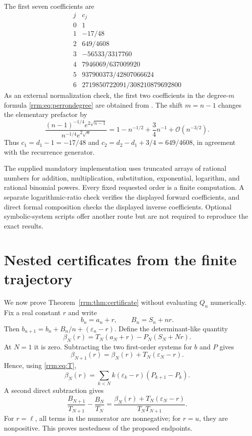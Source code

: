 \documentclass[11pt]{article}
\theoremstyle{remark}\newtheorem{remark}[theorem]{Remark}
\newcommand{\eps}{\varepsilon}
\newcommand{\OO}{\mathcal O}
\begin{document}
The first seven coefficients are
\begin{equation}\label{rrm:eq:ctable}
\begin{array}{c|r}
j&c_j\\\hline
0&1\\[2pt]
1&-17/48\\[2pt]
2&649/4608\\[2pt]
3&-56533/3317760\\[2pt]
4&7946069/637009920\\[2pt]
5&937900373/42807066624\\[2pt]
6&2719850722091/308210879692800
\end{array}
\end{equation}
As an external normalization check, the first two coefficients in the degree-$m$ formula \eqref{rrm:eq:perrondegree} are obtained from \cite[formula (27)]{dhm}. The shift $m=n-1$ changes the elementary prefactor by
\[
 \frac{(n-1)^{-1/4}e^{2\sqrt{n-1}}}{n^{-1/4}e^{2\sqrt n}}
 =1-n^{-1/2}+\frac34n^{-1}+\OO(n^{-3/2}).
\]
Thus $c_1=d_1-1=-17/48$ and $c_2=d_2-d_1+3/4=649/4608$, in agreement with the recurrence generator.

The supplied mandatory implementation uses truncated arrays of rational numbers for addition, multiplication, substitution, exponential, logarithm, and rational binomial powers. Every fixed requested order is a finite computation. A separate logarithmic-ratio check verifies the displayed forward coefficients, and direct formal composition checks the displayed inverse coefficients. Optional symbolic-system scripts offer another route but are not required to reproduce the exact results.

\section{Nested certificates from the finite trajectory}\label{rrm:sec:certproof}
We now prove Theorem~\ref{rrm:thm:certificate} without evaluating $Q_n$ numerically. Fix a real constant $r$ and write
\[
 b_n=a_n+r,\qquad B_n=S_n+nr.
\]
Then $b_{n+1}=b_n+B_n/n+(\eps_n-r)$. Define the determinant-like quantity
\begin{equation}\label{rrm:eq:beta}
 \beta_N(r)=T_N(a_N+r)-P_N(S_N+Nr).
\end{equation}
At $N=1$ it is zero. Subtracting the two first-order systems for $b$ and $P$ gives
\begin{equation}\label{rrm:eq:betaupdate}
 \beta_{N+1}(r)=\beta_N(r)+T_N(\eps_N-r).
\end{equation}
Hence, using \eqref{rrm:eq:T},
\begin{equation}\label{rrm:eq:betasum}
 \beta_N(r)=\sum_{k<N}k(\eps_k-r)(P_{k+1}-P_k).
\end{equation}
A second direct subtraction gives
\begin{equation}\label{rrm:eq:ratioupdate}
 \frac{B_{N+1}}{T_{N+1}}-\frac{B_N}{T_N}
 =\frac{\beta_N(r)+T_N(\eps_N-r)}{T_NT_{N+1}}.
\end{equation}
For $r=\ell$, all terms in the numerator are nonnegative; for $r=u$, they are nonpositive. This proves nestedness of the proposed endpoints.
\end{document}
